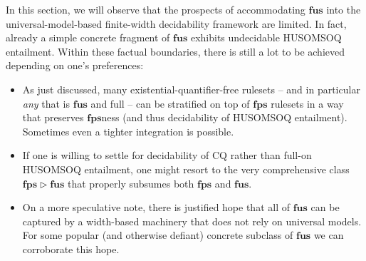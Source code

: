 \documentclass[10pt,a4paper]{amsart}
\theoremstyle{definition}
\numberwithin{equation}{section}
\theoremstyle{plain}
\theoremstyle{definition}
\theoremstyle{myexample}
\theoremstyle{plain}
\theoremstyle{definition}
\newcommand{\cut}{\triangleright}
\newcommand{\fus}{\mathbf{fus}}
\newcommand{\fps}{\mathbf{fps}} %
\newcommand{\hcs}{\fps}
\newcommand{\fhcs}{\hcs}
\begin{document}
In this section, we will observe that the prospects of accommodating $\fus$ into the universal-model-based finite-width decidability framework are limited. In fact, already a simple concrete fragment of $\fus$ exhibits undecidable HUSOMSOQ entailment. Within these factual boundaries, there is still a lot to be achieved depending on one's preferences:
\begin{itemize}
\item  
As just discussed, many existential-quantifier-free rulesets -- and in particular \emph{any} that is $\fus$ and full -- can be stratified on top of $\fhcs$ rulesets
in a way that preserves $\fhcs$ness (and thus decidability of HUSOMSOQ entailment). Sometimes even a tighter integration is possible.
\item  
If one is willing to settle for decidability of CQ rather than full-on HUSOMSOQ entailment, one might resort to the very comprehensive class $\fhcs\cut\fus$ that properly subsumes both $\fhcs$ and $\fus$.
\item
On a more speculative note, there is justified hope that all of $\fus$ can be captured by a width-based machinery that does not rely on universal models. For some popular (and otherwise defiant) concrete subclass of $\fus$ we can corroborate this hope. 
\end{itemize}
\end{document}
